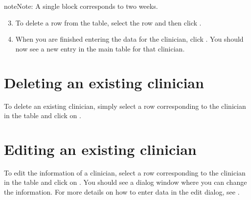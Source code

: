 \documentclass[letterpaper,10pt,english]{sphinxmanual}
\begin{document}
\begin{sphinxadmonition}{note}{Note:}
A single block corresponds to two weeks.
\end{sphinxadmonition}

\begin{figure}[H]
\centering
{}\end{figure}
\begin{enumerate}
\setcounter{enumi}{2}
\item {} 
To delete a row from the table, select the row and then click .

\end{enumerate}

\begin{figure}[H]
\centering
{}\end{figure}
\begin{enumerate}
\setcounter{enumi}{3}
\item {} 
When you are finished entering the data for the clinician, click .
You should now see a new entry in the main table for that clinician.

\end{enumerate}

\begin{figure}[H]
\centering
{}\end{figure}


\section{Deleting an existing clinician}
\label{\detokenize{manual:deleting-an-existing-clinician}}
To delete an existing clinician, simply select a row corresponding
to the clinician in the table and click on .

\begin{figure}[H]
\centering
{}\end{figure}


\section{Editing an existing clinician}
\label{\detokenize{manual:editing-an-existing-clinician}}
To edit the information of a clinician, select a row corresponding
to the clinician in the table and click on . You should
see a dialog window where you can change the information. For more
details on how to enter data in the edit dialog, see {\hyperref[\detokenize{manual:adding-a-new-clinician}]{}}.
\end{document}
